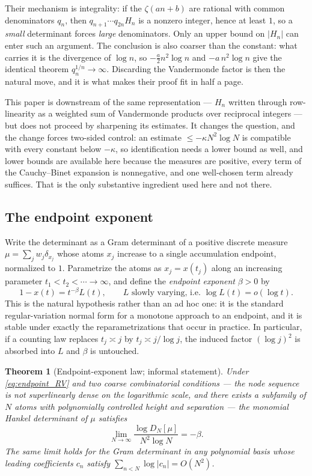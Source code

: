 \documentclass[11pt]{amsart}
\numberwithin{equation}{section}
\theoremstyle{plain}
\newtheorem{theorem}{Theorem}[section]
\theoremstyle{definition}
\theoremstyle{remark}
\begin{document}
\label{ss:whytwo}
Their mechanism is integrality: if the $\zeta(an+b)$ are rational with common denominators $q_{n}$,
then $q_{n+1}\cdots q_{2n}H_{n}$ is a nonzero integer, hence at least $1$, so a \emph{small}
determinant forces \emph{large} denominators. Only an upper bound on $|H_{n}|$ can enter such an
argument. The conclusion is also coarser than the constant: what carries it is the divergence of
$\log n$, so $-\tfrac a2n^{2}\log n$ and $-a\,n^{2}\log n$ give the identical theorem
$q_{n}^{1/n}\to\infty$. Discarding the Vandermonde factor is then the natural move, and it is what
makes their proof fit in half a page.

This paper is downstream of the same representation --- $H_{n}$ written through row-linearity as a
weighted sum of Vandermonde products over reciprocal integers --- but does not proceed by sharpening
its estimates. It changes the question, and the change forces two-sided control: an estimate $\le-\kappa N^{2}\log N$
is compatible with every constant below $-\kappa$, so identification needs a lower bound as well,
and lower bounds are available here because the measures are positive, every term of the
Cauchy--Binet expansion is nonnegative, and one well-chosen term already suffices. That is the only
substantive ingredient used here and not there.

\subsection{The endpoint exponent}

Write the determinant as a Gram determinant of a positive discrete measure
$\mu=\sum_{j}w_{j}\delta_{x_{j}}$ whose atoms $x_{j}$ increase to a single accumulation endpoint,
normalized to $1$. Parametrize the atoms as $x_{j}=x(t_{j})$ along an increasing parameter
$t_{1}<t_{2}<\cdots\to\infty$, and define the \emph{endpoint exponent} $\beta>0$ by
\begin{equation}
1-x(t)=t^{-\beta}L(t),\qquad L \text{ slowly varying, i.e. } \log L(t)=o(\log t).
\label{eq:endpoint_RV}
\end{equation}
This is the natural hypothesis rather than an ad hoc one: it is the standard regular-variation
normal form for a monotone approach to an endpoint, and it is stable under exactly the
reparametrizations that occur in practice. In particular, if a counting law replaces $t_{j}\asymp j$
by $t_{j}\asymp j/\log j$, the induced factor $(\log j)^{2}$ is absorbed into $L$ and $\beta$ is
untouched.

\begin{theorem}[Endpoint-exponent law; informal statement]
Under \eqref{eq:endpoint_RV} and two coarse combinatorial conditions --- the node sequence is not
superlinearly dense on the logarithmic scale, and there exists a subfamily of $N$ atoms with
polynomially controlled height and separation --- the monomial Hankel determinant of $\mu$ satisfies
\[
\lim_{N\to\infty}\frac{\log D_{N}[\mu]}{N^{2}\log N}=-\beta .
\]
The same limit holds for the Gram determinant in any polynomial basis whose leading coefficients
$c_{n}$ satisfy $\sum_{n<N}\log|c_{n}|=O(N^{2})$.
\end{theorem}
\end{document}
